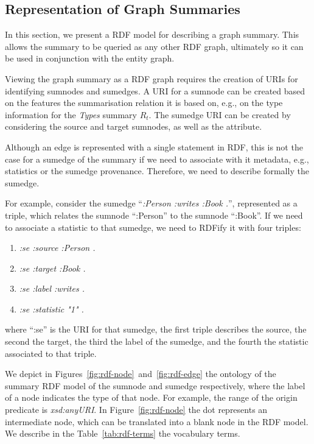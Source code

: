 \subsection{Representation of Graph Summaries}
\label{chap03:summary-rdf}

In this section, we present a RDF model for describing a graph summary. This allows the summary to be queried as any other RDF graph, ultimately so it can be used in conjunction with the entity graph.

Viewing the graph summary as a RDF graph requires the creation of URIs for identifying sumnodes and sumedges. A URI for a sumnode can be created based on the features the summarisation relation it is based on, e.g., on the type information for the \emph{Types} summary $R_t$. The sumedge URI can be created by considering the source and target sumnodes, as well as the attribute.

\begin{remark}
	Although an edge is represented with a single statement in RDF, this is not the case for a sumedge of the summary if we need to associate with it metadata, e.g., statistics or the sumedge provenance. Therefore, we need to describe formally the sumedge.

	For example, consider the sumedge ``\emph{:Person :writes :Book .}'', represented as a triple, which relates the sumnode ``:Person'' to the sumnode ``:Book''. If we need to associate a statistic to that sumedge, we need to RDFify it with four triples:
	\begin{enumerate}
		\item \emph{:se :source :Person .}
		\item \emph{:se :target :Book .}
		\item \emph{:se :label :writes .}
		\item \emph{:se :statistic "1" .}
	\end{enumerate}
	where ``:se'' is the URI for that sumedge, the first triple describes the source, the second the target, the third the label of the sumedge, and the fourth the statistic associated to that triple.
\end{remark}

We depict in Figures~\ref{fig:rdf-node}~and~\ref{fig:rdf-edge} the ontology of the summary RDF model of the sumnode and sumedge respectively, where the label of a node indicates the type of that node. For example, the range of the origin predicate is \emph{xsd:anyURI}. In Figure~\ref{fig:rdf-node} the dot represents an intermediate node, which can be translated into a blank node in the RDF model. We describe in the Table~\ref{tab:rdf-terms} the vocabulary terms.\\

